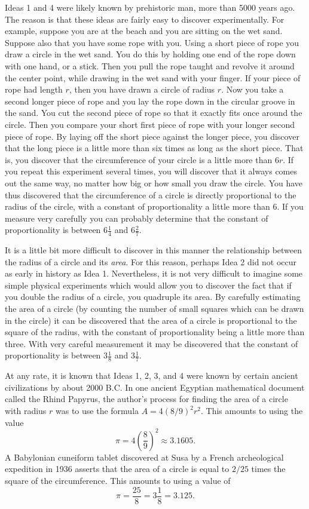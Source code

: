 \documentclass[twoside,twocolumn,12pt]{amsart}
\theoremstyle{plain}
\theoremstyle{definition}
\begin{document}
 Ideas 1 and 4 were likely known by prehistoric man, more than
5000 years ago. The reason is that these ideas are fairly easy to discover
experimentally. For example, suppose you are at the beach and you are
sitting on the wet sand. Suppose also that you have some rope with you.
Using a short piece of rope you draw a circle in the wet sand. You do this
by holding one end of the rope down with one hand, or a stick. Then you
pull the rope taught and revolve it around the center point, while drawing
in the wet sand with your finger. If your  piece of rope had length
$r$, then you have drawn a circle of radius $r$. Now you take a second
longer piece of
rope and you lay the rope down in the circular groove in the sand. You
cut the second piece of rope so that it exactly fits once around the
circle. Then you compare your short first piece of rope with your longer
second piece of rope. By laying off the short piece against the longer
piece, you discover that the long piece is a little more than six times
as long as the short piece.  That is, you discover that the circumference
of your circle is a little more than $6r$.
If you repeat this experiment several times,
you will discover that it always comes out the same way, no matter how big
or how small you draw the circle. You have thus discovered that the
circumference of a circle is directly proportional to the radius of the
circle, with a constant of proportionality a little more than 6. If you
measure very carefully you can probably determine that the constant of
proportionality is between $6\frac{1}{4}$ and $6\frac{2}{7}$.

It is a little bit more difficult to discover in this manner the
relationship between the radius of a circle and its \emph{area}. For
this reason, perhaps Idea 2 did not occur as early in history as Idea 1.
Nevertheless, it is not very difficult to imagine some simple physical
experiments which would allow you to discover the fact that if you
double the radius of a circle, you quadruple its area. By carefully
estimating  the area of a circle (by counting the number of small squares
which can be drawn in the circle) it can be discovered that the area of
a circle is proportional to the square of the radius, with the constant
of proportionality being a little more than three. With very careful
measurement it may be discovered that the constant of proportionality
is between $3\frac{1}{8}$ and $3\frac{1}{7}$.

At any rate, it is known that Ideas 1, 2, 3, and 4 were known by certain
ancient civilizations by about 2000 B.C.  In one ancient Egyptian
mathematical document called the Rhind Papyrus, the author's process
for finding the area of a circle with radius $r$ was to use the
formula $A=4(8/9)^2 r^2$. This amounts to using the value
$$\pi=4\left(\frac{8}{9}\right)^2\approx 3.1605.$$ A Babylonian cuneiform
tablet discovered at Susa by a French archeological expedition in 1936
asserts that the area of a circle is equal to $2/25$ times the square
of the circumference. This amounts to using a value of
$$\pi=\frac{25}{8}=3\frac{1}{8}=3.125.$$
\end{document}
